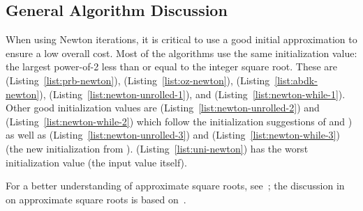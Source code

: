 







\subsection{General Algorithm Discussion}

When using Newton iterations, it is critical to use
a good initial approximation to ensure a low overall cost.
Most of the algorithms use the same initialization value:
the largest power-of-2 less than or equal to the integer square root.
These are
\prb{} (Listing~\ref{list:prb-newton}),
\OpenZeppelin{} (Listing~\ref{list:oz-newton}),
\abdk{} (Listing~\ref{list:abdk-newton}),
\UnrolledOne{} (Listing~\ref{list:newton-unrolled-1}), and
\WhileOne{} (Listing~\ref{list:newton-while-1}).
Other good initialization values are 
\UnrolledTwo{} (Listing~\ref{list:newton-unrolled-2}) and
\WhileTwo{} (Listing~\ref{list:newton-while-2}) 
which follow the initialization suggestions of
\cite[Chapter 1.7, Remarks (2)]{cohen1993} and
\cite[Algorithm 9.2.11]{PrimeNumbersACP2005})
as well as
\UnrolledThree{} (Listing~\ref{list:newton-unrolled-3}) and
\WhileThree{} (Listing~\ref{list:newton-while-3})
(the new initialization from \cite{EfficientIsqrt}).
\Uniswap{} (Listing~\ref{list:uni-newton}) has the worst
initialization value (the input value itself).

For a better understanding of approximate square roots,
see~\cite{PythonIsqrt};
the discussion in~\cite{EfficientIsqrt} on approximate square roots
is based on~\cite{PythonIsqrt}.
